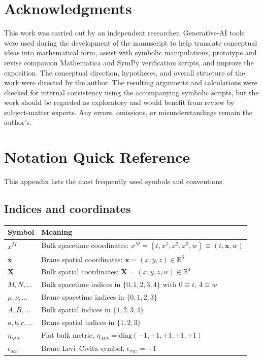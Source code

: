 \documentclass[11pt]{article}
\begin{document}
\section*{Acknowledgments}
This work was carried out by an independent researcher. Generative-AI tools were used during
the development of the manuscript to help translate conceptual ideas into mathematical form,
assist with symbolic manipulations, prototype and revise companion Mathematica and SymPy
verification scripts, and improve the exposition. The conceptual direction, hypotheses, and
overall structure of the work were directed by the author. The resulting arguments and
calculations were checked for internal consistency using the accompanying symbolic scripts, but
the work should be regarded as exploratory and would benefit from review by subject-matter
experts. Any errors, omissions, or misunderstandings remain the author's.

\appendix

\section{Notation Quick Reference}
\label{app:notation}

This appendix lists the most frequently used symbols and conventions.

\subsection*{Indices and coordinates}

\begin{center}
\begin{tabular}{@{}ll@{}}
\toprule
Symbol & Meaning \\
\midrule
$x^M$ & Bulk spacetime coordinates: $x^M=(t,x^1,x^2,x^3,w)\equiv (t,\mathbf{x},w)$ \\
$\mathbf{x}$ & Brane spatial coordinates: $\mathbf{x}=(x,y,z)\in\mathbb{R}^3$ \\
$\mathbf{X}$ & Bulk spatial coordinates: $\mathbf{X}=(x,y,z,w)\in\mathbb{R}^4$ \\
$M,N,\ldots$ & Bulk spacetime indices in $\{0,1,2,3,4\}$ with $0\equiv t$, $4\equiv w$ \\
$\mu,\nu,\ldots$ & Brane spacetime indices in $\{0,1,2,3\}$ \\
$A,B,\ldots$ & Bulk spatial indices in $\{1,2,3,4\}$ \\
$a,b,c,\ldots$ & Brane spatial indices in $\{1,2,3\}$ \\
$\eta_{MN}$ & Flat bulk metric, $\eta_{MN}=\mathrm{diag}(-1,+1,+1,+1,+1)$ \\
$\epsilon_{abc}$ & Brane Levi--Civita symbol, $\epsilon_{xyz}=+1$ \\
\bottomrule
\end{tabular}
\end{center}
\end{document}
